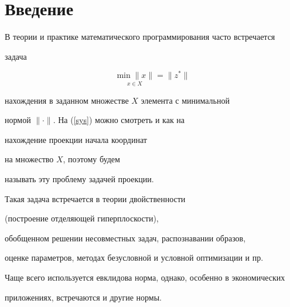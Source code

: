 \date{}




\pagestyle{plain} %







\maketitle


\label{begin}








\section*{Введение}


В теории и практике математического программирования часто встречается


задача


\begin{equation}\label{sys}


\underset{x\in X}{\min \|x\|}{}= \|z^\ast\|


\end{equation}


нахождения в заданном множестве $X$ элемента с минимальной 


нормой $\|\cdot\|$. На (\ref{sys}) можно смотреть и как на 


нахождение проекции начала координат


на множество $X$, поэтому будем 


называть эту проблему задачей проекции. 





Такая задача встречается в теории двойственности 


(построение отделяющей гиперплоскости),


обобщенном решении несовместных задач,  распознавании образов,


оценке параметров, методах безусловной и условной оптимизации и пр.


Чаще всего используется евклидова норма, однако, особенно в экономических


приложениях, встречаются и другие нормы.





